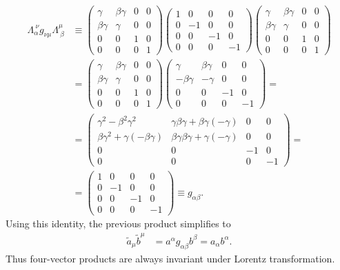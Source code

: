 \documentclass[english, parskip=full]{scrartcl}
\begin{document}
\begin{align}
\Lambda_{\alpha}^{\ \nu} g_{\nu\mu} \Lambda^\mu_{\ \beta} &\equiv \begin{pmatrix}
\gamma & \beta\gamma & 0 & 0 \\
\beta\gamma & \gamma & 0 & 0 \\
0 & 0 & 1 & 0 \\
0 & 0 & 0 & 1
\end{pmatrix} \begin{pmatrix}
1 & 0 & 0 & 0 \\
0 & -1 & 0 & 0 \\
0 & 0 & -1 & 0 \\
0 & 0 & 0 & -1
\end{pmatrix} \begin{pmatrix}
\gamma & \beta\gamma & 0 & 0 \\
\beta\gamma & \gamma & 0 & 0 \\
0 & 0 & 1 & 0 \\
0 & 0 & 0 & 1
\end{pmatrix} \\ 
&= \begin{pmatrix}
\gamma & \beta\gamma & 0 & 0 \\
\beta\gamma & \gamma & 0 & 0 \\
0 & 0 & 1 & 0 \\
0 & 0 & 0 & 1
\end{pmatrix} \begin{pmatrix}
\gamma & \beta\gamma & 0 & 0 \\
-\beta\gamma & -\gamma & 0 & 0 \\
0 & 0 & -1 & 0 \\
0 & 0 & 0 & -1
\end{pmatrix} = \\
&= \begin{pmatrix}
\gamma^2 - \beta^2\gamma^2 & \gamma\beta\gamma + \beta\gamma(-\gamma) & 0 & 0 \\
\beta\gamma^2 + \gamma(-\beta\gamma) & \beta\gamma\beta\gamma + \gamma(-\gamma) & 0 & 0 \\
0 & 0 & -1 & 0 \\
0 & 0 & 0 & -1
\end{pmatrix} = \\
&= \begin{pmatrix}
1 & 0 & 0 & 0 \\
0 & -1 & 0 & 0 \\
0 & 0 & -1 & 0 \\
0 & 0 & 0 & -1
\end{pmatrix} \equiv g_{\alpha\beta}.
\end{align}
Using this identity, the previous product simplifies to
\begin{align}
\tilde{a}_\mu \tilde{b}^\mu &= a^\alpha g_{\alpha\beta} b^\beta = a_\alpha b^\alpha.
\end{align}
Thus four-vector products are always invariant under Lorentz transformation.
\end{document}
